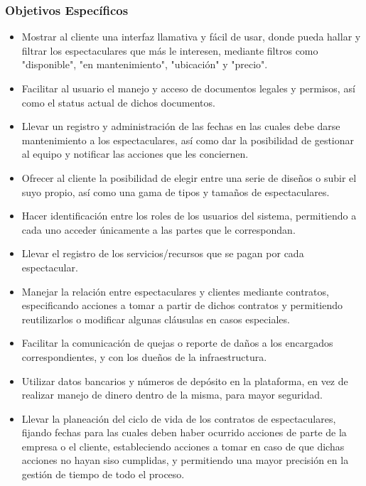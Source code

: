 \subsubsection{Objetivos Específicos}

\begin{itemize}
	\item Mostrar al cliente una interfaz llamativa y fácil de usar, donde pueda hallar y filtrar los espectaculares que más le interesen, mediante filtros como "disponible", "en mantenimiento", "ubicación" y "precio".
    
	\item Facilitar al usuario el manejo y acceso de documentos legales y permisos, así como el status actual de dichos documentos.
    
	\item Llevar un registro y administración de las fechas en las cuales debe darse mantenimiento a los espectaculares, así como dar la posibilidad de gestionar al equipo y notificar las acciones que les conciernen.
    
	\item Ofrecer al cliente la posibilidad de elegir entre una serie de diseños o subir el suyo propio, así como una gama de tipos y tamaños de espectaculares.
    
	\item Hacer identificación entre los roles de los usuarios del sistema, permitiendo a cada uno acceder únicamente a las partes que le correspondan.
    
	\item Llevar el registro de los servicios/recursos que se pagan por cada espectacular.
    
	\item Manejar la relación entre espectaculares y clientes mediante contratos, especificando acciones a tomar a partir de dichos contratos y permitiendo reutilizarlos o modificar algunas cláusulas en casos especiales.
    
	\item Facilitar la comunicación de quejas o reporte de daños a los encargados correspondientes, y con los dueños de la infraestructura.
    
	\item Utilizar datos bancarios y números de depósito en la plataforma, en vez de realizar manejo de dinero dentro de la misma, para mayor seguridad.
    
	\item Llevar la planeación del ciclo de vida de los contratos de espectaculares, fijando fechas para las cuales deben haber ocurrido acciones de parte de la empresa o el cliente, estableciendo acciones a tomar en caso de que dichas acciones no hayan siso cumplidas, y permitiendo una mayor precisión en la gestión de tiempo de todo el proceso.
    

\end{itemize}
